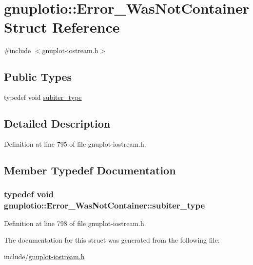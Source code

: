 \hypertarget{structgnuplotio_1_1_error___was_not_container}{}\section{gnuplotio\+:\+:Error\+\_\+\+Was\+Not\+Container Struct Reference}
\label{structgnuplotio_1_1_error___was_not_container}


{\ttfamily \#include $<$gnuplot-\/iostream.\+h$>$}

\subsection*{Public Types}
\begin{DoxyCompactItemize}
\item 
typedef void \hyperlink{structgnuplotio_1_1_error___was_not_container_aeac5de90c903be765130fc14f85dfb00}{subiter\+\_\+type}
\end{DoxyCompactItemize}


\subsection{Detailed Description}


Definition at line 795 of file gnuplot-\/iostream.\+h.



\subsection{Member Typedef Documentation}
\subsubsection[{\texorpdfstring{subiter\+\_\+type}{subiter_type}}]{\setlength{\rightskip}{0pt plus 5cm}typedef void {\bf gnuplotio\+::\+Error\+\_\+\+Was\+Not\+Container\+::subiter\+\_\+type}}\hypertarget{structgnuplotio_1_1_error___was_not_container_aeac5de90c903be765130fc14f85dfb00}{}\label{structgnuplotio_1_1_error___was_not_container_aeac5de90c903be765130fc14f85dfb00}


Definition at line 798 of file gnuplot-\/iostream.\+h.



The documentation for this struct was generated from the following file\+:\begin{DoxyCompactItemize}
\item 
include/\hyperlink{gnuplot-iostream_8h}{gnuplot-\/iostream.\+h}\end{DoxyCompactItemize}
